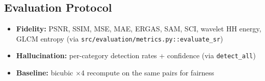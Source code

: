 \subsection{Evaluation Protocol}
\begin{itemize}
    \item \textbf{Fidelity:} PSNR, SSIM, MSE, MAE, ERGAS, SAM, SCI, wavelet HH energy, GLCM entropy (via \texttt{src/evaluation/metrics.py::evaluate\_sr})
    \item \textbf{Hallucination:} per-category detection rates + confidence (via \texttt{detect\_all})
    \item \textbf{Baseline:} bicubic $\times$4 recompute on the same pairs for fairness
\end{itemize}

